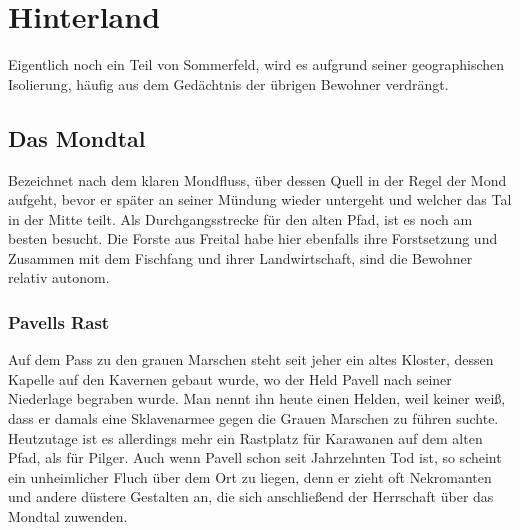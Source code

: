 \documentclass[a4paper,12pt,oneside]{book}
\begin{document}
\chapter{Hinterland}
Eigentlich noch ein Teil von Sommerfeld, wird es aufgrund seiner geographischen Isolierung, häufig aus dem Gedächtnis der übrigen Bewohner verdrängt. 

\section{Das Mondtal}
Bezeichnet nach dem klaren Mondfluss, über dessen Quell in der Regel der Mond aufgeht, bevor er später an seiner Mündung wieder untergeht und welcher das Tal in der Mitte teilt. Als Durchgangsstrecke für den alten Pfad, ist es noch am besten besucht. Die Forste aus Freital habe hier ebenfalls ihre Forstsetzung und Zusammen mit dem Fischfang und ihrer Landwirtschaft, sind die Bewohner relativ autonom.

\subsection{Pavells Rast}
Auf dem Pass zu den grauen Marschen steht seit jeher ein altes Kloster, dessen Kapelle auf den Kavernen gebaut wurde, wo der Held Pavell nach seiner Niederlage begraben wurde. Man nennt ihn heute einen Helden, weil keiner weiß, dass er damals eine Sklavenarmee gegen die Grauen Marschen zu führen suchte. Heutzutage ist es allerdings mehr ein Rastplatz für Karawanen auf dem alten Pfad, als für Pilger. Auch wenn Pavell schon seit Jahrzehnten Tod ist, so scheint ein unheimlicher Fluch über dem Ort zu liegen, denn er zieht oft Nekromanten und andere düstere Gestalten an, die sich anschließend der Herrschaft über das Mondtal zuwenden.
\end{document}
